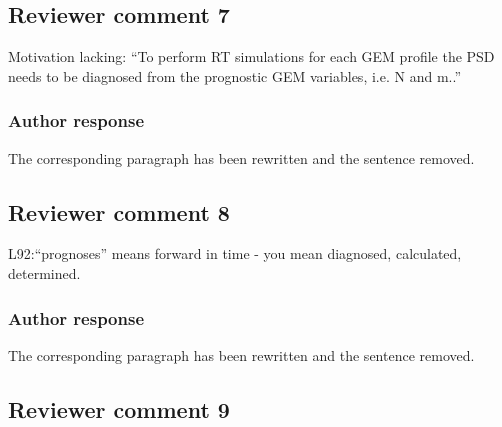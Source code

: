 \subsection*{Reviewer comment 7}

Motivation lacking: “To perform RT simulations for each GEM profile the PSD
needs to be diagnosed from the prognostic GEM variables, i.e. N and m..”

\subsubsection*{Author response}

The corresponding paragraph has been rewritten and the sentence removed.

%


\subsection*{Reviewer comment 8}

L92:“prognoses”   means   forward   in   time   -   you   mean   diagnosed,   calculated,
determined.

\subsubsection*{Author response}

The corresponding paragraph has been rewritten and the sentence removed.



\subsection*{Reviewer comment 9}


